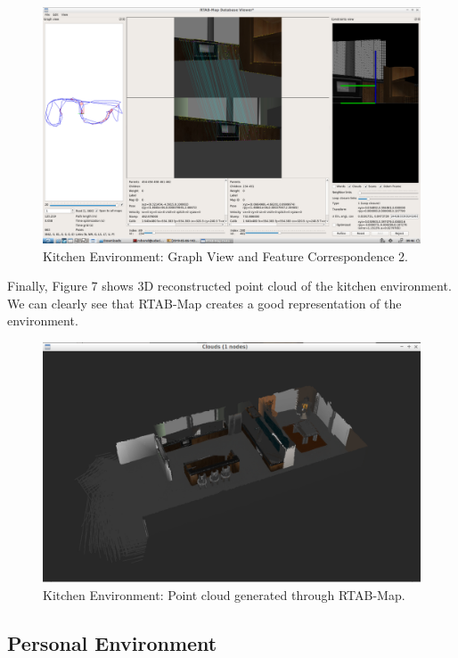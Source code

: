 \documentclass[10pt,journal,compsoc]{IEEEtran}
\begin{document}
\begin{figure}[thpb]
      \centering
      \includegraphics[width=\linewidth]{rtab-map-viewer-corresponence.png}
      \caption{Kitchen Environment: Graph View and Feature Correspondence 2.}
      \label{fig:network-training}
\end{figure}

Finally, Figure 7 shows 3D reconstructed point cloud of the kitchen environment. We can clearly see that RTAB-Map creates a good representation of the environment.

\begin{figure}[thpb]
      \centering
      \includegraphics[width=\linewidth]{kitchen-point-cloud.png}
      \caption{Kitchen Environment: Point cloud generated through RTAB-Map.}
      \label{fig:network-training}
\end{figure}

\subsection{Personal Environment}
\end{document}
